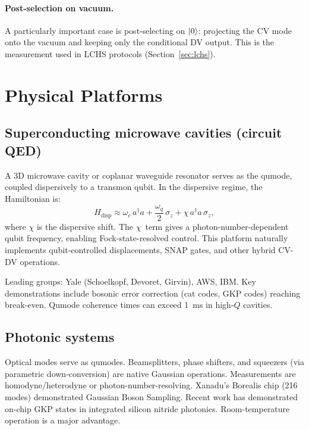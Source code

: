 \documentclass[11pt]{article}
\newcommand{\ad}{a^{\dagger}}
\begin{document}
\paragraph{Post-selection on vacuum.}
A particularly important case is post-selecting on $\ket{0}$:
projecting the CV mode onto the vacuum and keeping only the
conditional DV output.  This is the measurement used in LCHS
protocols (Section~\ref{sec:lchs}).

\section{Physical Platforms}
\label{sec:platforms}

\subsection{Superconducting microwave cavities (circuit QED)}

A 3D microwave cavity or coplanar waveguide resonator serves as the
qumode, coupled dispersively to a transmon qubit.
In the dispersive regime, the Hamiltonian is:
\begin{equation}
H_{\mathrm{disp}} \approx \omega_c\, \ad a
  + \frac{\omega_q}{2}\,\sigma_z
  + \chi\, \ad a\, \sigma_z,
\end{equation}
where $\chi$ is the dispersive shift.  The $\chi$~term gives a
photon-number-dependent qubit frequency, enabling Fock-state-resolved
control.  This platform naturally implements qubit-controlled
displacements, SNAP gates, and other hybrid CV-DV operations.

Leading groups: Yale (Schoelkopf, Devoret, Girvin), AWS, IBM.
Key demonstrations include bosonic error correction (cat codes, GKP codes)
reaching break-even.
Qumode coherence times can exceed 1~ms in high-$Q$ cavities.

\subsection{Photonic systems}

Optical modes serve as qumodes.  Beamsplitters, phase shifters, and
squeezers (via parametric down-conversion) are native Gaussian operations.
Measurements are homodyne/heterodyne or photon-number-resolving.
Xanadu's Borealis chip (216 modes) demonstrated Gaussian Boson Sampling.
Recent work has demonstrated on-chip GKP states in integrated silicon
nitride photonics.
Room-temperature operation is a major advantage.
\end{document}
